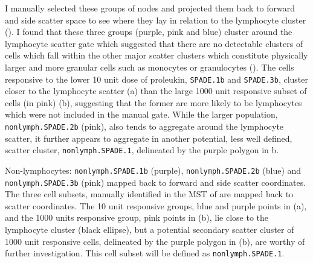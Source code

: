 I manually selected these groups of nodes and projected them back to forward and side scatter space to see where they lay in relation
to the lymphocyte cluster ().  
I found that these three groups (purple, pink and blue) cluster around the lymphocyte scatter gate which suggested that there are no detectable clusters of cells which fall within the other major scatter clusters which constitute physically larger and more granular cells such as monocytes or granulocytes ().
The cells responsive to the lower 10 unit dose of proleukin, \texttt{SPADE.1b} and \texttt{SPADE.3b}, cluster closer to the lymphocyte scatter (a) than the large 1000 unit responsive subset of cells (in pink) (b), suggesting that the former are more likely to be lymphocytes which were not included in the manual gate.
While the larger population, \texttt{nonlymph.SPADE.2b} (pink), also tends to aggregate around the lymphocyte scatter, it further appears to aggregate in another potential, less well defined, scatter cluster, \texttt{nonlymph.SPADE.1}, delineated by the purple polygon in b.

{
 Non-lymphocytes: \texttt{nonlymph.SPADE.1b} (purple), \texttt{nonlymph.SPADE.2b} (blue) and \texttt{nonlymph.SPADE.3b} (pink) mapped back to forward and side scatter coordinates.
}
{
 The three cell subsets, manually identified in the \gls{MST} of  are mapped back to scatter coordinates.
 The 10 unit responsive groups, blue and purple points in (a), and the 1000 units responsive group, pink points in (b),
 lie close to the lymphocyte cluster (black ellipse),
 but a potential secondary scatter cluster of 1000 unit responsive cells, delineated by the purple polygon in (b), are worthy of further investigation.
 This cell subset will be defined as \texttt{nonlymph.SPADE.1}.
}


